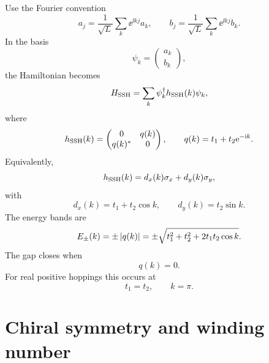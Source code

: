Use the Fourier convention
\begin{equation}
    a_j=\frac{1}{\sqrt{L}}\sum_k\ee^{\ii kj}a_k,
    \qquad
    b_j=\frac{1}{\sqrt{L}}\sum_k\ee^{\ii kj}b_k.
\end{equation}
In the basis
\begin{equation}
\label{eq:ssh-bloch-spinor}
    \psi_k=
    \begin{pmatrix}
        a_k\\ b_k
    \end{pmatrix},
\end{equation}
the Hamiltonian becomes
\begin{equation}
\label{eq:ssh-momentum-hamiltonian}
    H_{\rm SSH}
    =
    \sum_k\psi_k^\dagger h_{\rm SSH}(k)\psi_k,
\end{equation}
where
\begin{equation}
\label{eq:ssh-bloch-matrix}
    h_{\rm SSH}(k)
    =
    \begin{pmatrix}
        0&q(k)\\
        q(k)^*&0
    \end{pmatrix},
    \qquad
    q(k)=t_1+t_2\mathrm{e}^{-\mathrm{i} k}.
\end{equation}
Equivalently,
\begin{equation}
\label{eq:ssh-d-vector}
    h_{\rm SSH}(k)
    =
    d_x(k)\sigma_x+d_y(k)\sigma_y,
\end{equation}
with
\begin{equation}
\label{eq:ssh-d-components}
    d_x(k)=t_1+t_2\cos k,
    \qquad
    d_y(k)=t_2\sin k.
\end{equation}
The energy bands are
\begin{equation}
\label{eq:ssh-band-energies}
    E_\pm(k)=\pm\left|q(k)\right|
    =
    \pm\sqrt{t_1^2+t_2^2+2t_1t_2\cos k}.
\end{equation}
The gap closes when
\begin{equation}
\label{eq:ssh-gap-closing}
    q(k)=0.
\end{equation}
For real positive hoppings this occurs at
\begin{equation}
\label{eq:ssh-critical-point}
    t_1=t_2,
    \qquad
    k=\pi.
\end{equation}

\section{Chiral symmetry and winding number}
\label{sec:ssh-chiral-symmetry-winding}

